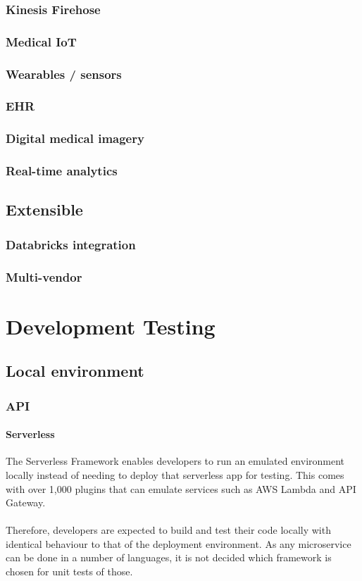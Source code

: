 \documentclass[10pt]{article}
\begin{document}
\subsubsection{Kinesis Firehose}
\subsubsection{Medical IoT}
\subsubsection{Wearables / sensors}
\subsubsection{EHR}
\subsubsection{Digital medical imagery}
\subsubsection{Real-time analytics}

\subsection{Extensible}
\subsubsection{Databricks integration}
\subsubsection{Multi-vendor}

\section{Development Testing}
\subsection{Local environment}

\subsubsection{API}
\paragraph{Serverless}
The Serverless Framework enables developers to run an emulated environment locally instead of needing to deploy that serverless app for testing. This comes with over 1,000 plugins that can emulate services such as AWS Lambda and API Gateway. 
\\ \\
Therefore, developers are expected to build and test their code locally with identical behaviour to that of the deployment environment. As any microservice can be done in a number of languages, it is not decided which framework is chosen for unit tests of those.
\end{document}
